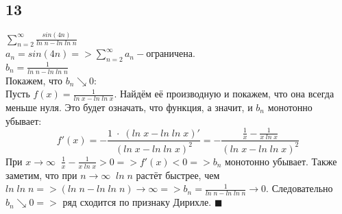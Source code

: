 \documentclass[a4paper,fleqn]{article}
\begin{document}
	\subsection*{13}
	$\displaystyle \sum\limits_{n = 2}^{\infty} \frac{sin(4n)}{ln \; n - ln \; ln \; n}$ \\
	$\displaystyle a_n = sin(4n) => \sum\limits_{n = 2}^{\infty} a_n - \text{ограничена}$. \\
	$\displaystyle b_n = \frac{1}{ln \; n - ln \; ln \; n}$ \\
	Покажем, что $\displaystyle b_n \searrow 0$: \\
	Пусть $\displaystyle f(x) = \frac{1}{ln \; x - ln \; ln \; x}$. Найдём её производную и покажем, что она всегда меньше нуля. Это будет означать, что функция, а значит, и $\displaystyle b_n$ монотонно убывает: \\
	\begin{equation*} f'(x) = -\frac{1 \; \cdot \; (ln \; x - ln \; ln \; x)'}{(ln \; x - ln \; ln \; x)^2} = -\frac{\frac{1}{x} - \frac{1}{x\; ln \; x}}{(ln \; x - ln \; ln \; x)^2} \end{equation*}
	При $\displaystyle x \rightarrow \infty \; \; \frac{1}{x} - \frac{1}{x\; ln \; x} > 0 => f'(x) < 0 => b_n$ монотонно убывает. Также заметим, что при $\displaystyle n \rightarrow \infty \; \; ln \; n$ растёт быстрее, чем $ln\; ln\; n => (ln \; n - ln \; ln \; n) \rightarrow \infty => b_n = \frac{1}{ln \; n - ln \; ln \; n} \rightarrow 0$. Следовательно $\displaystyle b_n \searrow 0 =>$ ряд сходится по признаку Дирихле. $\displaystyle \blacksquare$ \\
	
	
\end{document}
